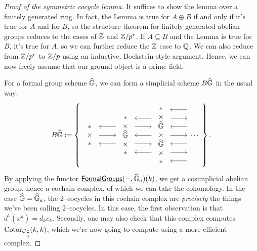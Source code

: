 \begin{proof}[Proof of the symmetric cocycle lemma]
It suffices to show the lemma over a finitely generated ring.  In fact, the Lemma is true for $A \oplus B$ if and only if it's true for $A$ and for $B$, so the structure theorem for finitely generated abelian groups reduces to the cases of $\mathbb Z$ and $\mathbb Z/p^r$.  If $A \subseteq B$ and the Lemma is true for $B$, it's true for $A$, so we can further reduce the $\mathbb Z$ case to $\mathbb{Q}$.  We can also reduce from $\mathbb Z/p^r$ to $\mathbb Z/p$ using an inductive, Bockstein-style argument.  Hence, we can now freely assume that our ground object is a prime field.

For a formal group scheme $\widehat{\mathbb G}$, we can form a simplicial scheme $B\widehat{\mathbb G}$ in the usual way:
\[B\G := \left\{
\begin{tikzcd}[ampersand replacement=\&]
\begin{array}{c} * \\ \times \\ * \end{array} \arrow{r} \arrow[leftarrow,shift left=\baselineskip]{r} \arrow[leftarrow,shift right=\baselineskip]{r} \&
\begin{array}{c} * \\ \times \\ \G \\ \times \\ * \end{array} \arrow[leftarrow, shift left=(2*\baselineskip)]{r} \arrow[shift left=\baselineskip]{r} \arrow[leftarrow]{r} \arrow[shift right=\baselineskip]{r} \arrow[leftarrow, shift right=(2*\baselineskip)]{r} \&
\begin{array}{c} * \\ \times \\ \G \\ \times \\ \G \\ \times \\ *\end{array} \arrow[leftarrow, shift left=(3*\baselineskip)]{r} \arrow[shift left=(2*\baselineskip)]{r} \arrow[leftarrow, shift left=\baselineskip]{r} \arrow{r} \arrow[leftarrow, shift right=\baselineskip]{r} \arrow[shift right=(2*\baselineskip)]{r} \arrow[leftarrow, shift right=(3*\baselineskip)]{r} \&
\cdots
\end{tikzcd}
\right\}.\]
By applying the functor $\operatorname{\underline{\smash{\mathsf{FormalGroups}}}}(-, \widehat{\mathbb G}_a)(k)$, we get a cosimplicial abelian group, hence a cochain complex, of which we can take the cohomology.  In the case $\widehat{\mathbb G} = \widehat{\mathbb G}_a$, the $2$--cocycles in this cochain complex are \emph{precisely} the things we've been calling $2$--cocycles.  In this case, the first observation is that $d^1(x^k) = d_k c_k$.  Secondly, one may also check that this complex computes $\operatorname{Cotor}_{\mathcal{O}_{\widehat{\mathbb G}}^*}(k, k)$, which we're now going to compute using a more efficient complex.


\end{proof}
